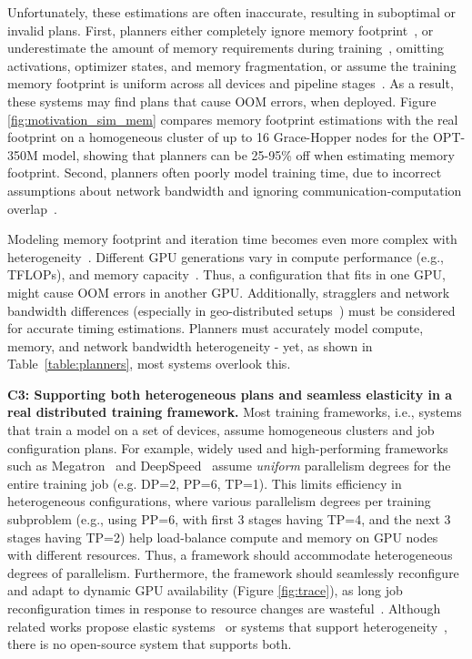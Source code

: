 Unfortunately, these estimations are often inaccurate, resulting in suboptimal or invalid plans. First,  planners either completely ignore memory footprint~\cite{li2022amp}, or underestimate the amount of memory requirements during training~\cite{Athlur22Varuna, Jang2023Oobleck}, omitting activations, optimizer states, and memory fragmentation, or assume the training memory footprint is uniform across all devices and pipeline stages~\cite{yan2024flashflex, Lin24nnScaler}. As a result, these systems may find plans that cause OOM errors, when deployed. Figure \ref{fig:motivation_sim_mem} compares memory footprint estimations with the real footprint on a homogeneous cluster of up to 16 Grace-Hopper nodes for the OPT-350M model, showing that planners can be 25-95\% off when estimating memory footprint.  Second, planners often poorly model training time, due to incorrect assumptions about network bandwidth and ignoring communication-computation overlap~\cite{Zhang17Poseidon, megatron-deepspeed}.

Modeling memory footprint and iteration time becomes even more complex with heterogeneity~\cite{Mo24Heet}. Different GPU generations vary in compute performance (e.g., TFLOPs), and memory capacity~\cite{zhu2024nanoflow}. Thus, a configuration that fits in one GPU, might cause OOM errors in another GPU. Additionally, stragglers and network bandwidth differences (especially in geo-distributed setups~\cite{strati24crossregion}) must be considered for accurate timing estimations. Planners must accurately model compute, memory, and network bandwidth heterogeneity - yet, as shown in Table~\ref{table:planners}, most systems overlook this.


\textbf{C3: Supporting both heterogeneous plans and seamless elasticity in a real distributed training framework.}   
Most training frameworks, i.e., systems that train a model on a set of devices, assume homogeneous clusters and job configuration plans. For example, widely used and high-performing frameworks such as Megatron~\cite{shoeybi2020megatronlm} and DeepSpeed~\cite{megatron-deepspeed} assume \textit{uniform} parallelism degrees for the entire training job (e.g. DP=2, PP=6, TP=1). This limits efficiency in heterogeneous configurations, where various parallelism degrees per training subproblem (e.g., using PP=6, with first 3 stages having TP=4, and the next 3 stages having TP=2) help load-balance compute and memory on GPU nodes with different resources. Thus, a framework should accommodate heterogeneous degrees of parallelism. Furthermore, the framework should seamlessly reconfigure and adapt to dynamic GPU availability (Figure \ref{fig:trace}), as long job reconfiguration times in response to resource changes are wasteful~\cite{Thorpe23Bamboo, wagenlander24tenplex}. Although related works propose elastic systems~\cite{Athlur22Varuna, Thorpe23Bamboo, Duan24Parcae} or systems that support heterogeneity~\cite{Miao23SDPipe, yan2024flashflex}, there is no open-source system that supports both.

